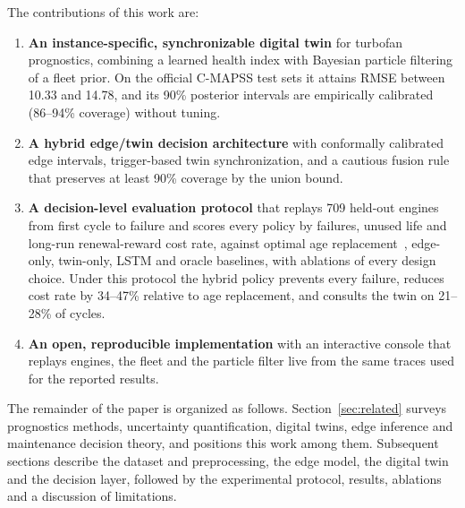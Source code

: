 The contributions of this work are:
\begin{enumerate}
  \item \textbf{An instance-specific, synchronizable digital twin} for
  turbofan prognostics, combining a learned health index with Bayesian
  particle filtering of a fleet prior. On the official C-MAPSS test sets it
  attains RMSE between 10.33 and 14.78, and its 90\% posterior intervals are
  empirically calibrated (86--94\% coverage) without tuning.
  \item \textbf{A hybrid edge/twin decision architecture} with conformally
  calibrated edge intervals, trigger-based twin synchronization, and a
  cautious fusion rule that preserves at least 90\% coverage by the union
  bound.
  \item \textbf{A decision-level evaluation protocol} that replays 709
  held-out engines from first cycle to failure and scores every policy by
  failures, unused life and long-run renewal-reward cost rate, against optimal
  age replacement~\cite{barlow1960optimum}, edge-only, twin-only, LSTM and
  oracle baselines, with ablations of every design choice. Under this
  protocol the hybrid policy prevents every failure, reduces cost rate by
  34--47\% relative to age replacement, and consults the twin on 21--28\% of
  cycles.
  \item \textbf{An open, reproducible implementation} with an interactive
  console that replays engines, the fleet and the particle filter live from
  the same traces used for the reported results.
\end{enumerate}

The remainder of the paper is organized as follows.
Section~\ref{sec:related} surveys prognostics methods, uncertainty
quantification, digital twins, edge inference and maintenance decision theory,
and positions this work among them. Subsequent sections describe the dataset
and preprocessing, the edge model, the digital twin and the decision layer,
followed by the experimental protocol, results, ablations and a discussion of
limitations.
